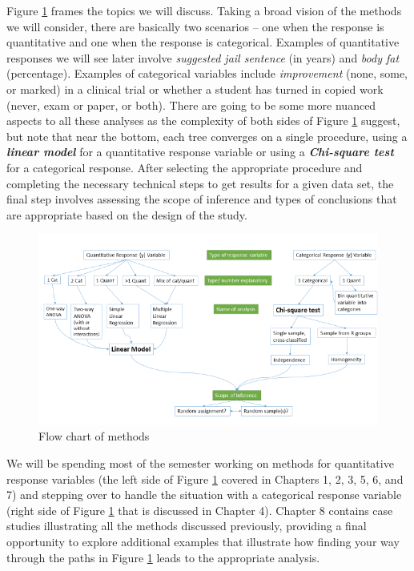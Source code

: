 \documentclass[]{book}
\begin{document}
Figure \ref{fig:Figure1} frames the topics we will discuss. Taking a
broad vision of the methods we will consider, there are basically two
scenarios -- one when the response is quantitative and one when the
response is categorical. Examples of quantitative responses we will see
later involve \emph{suggested jail sentence} (in years) and \emph{body
fat} (percentage). Examples of categorical variables include
\emph{improvement} (none, some, or marked) in a clinical trial or
whether a student has turned in copied work (never, exam or paper, or
both). There are going to be some more nuanced aspects to all these
analyses as the complexity of both sides of Figure \ref{fig:Figure1}
suggest, but note that near the bottom, each tree converges on a single
procedure, using a \textbf{\emph{linear model}} for a quantitative
response variable or using a \textbf{\emph{Chi-square test}} for a
categorical response. After selecting the appropriate procedure and
completing the necessary technical steps to get results for a given data
set, the final step involves assessing the scope of inference and types
of conclusions that are appropriate based on the design of the study.



\begin{figure}
\includegraphics[width=8.89in]{chapter0_files/image001} \caption{Flow chart of methods}\label{fig:Figure1}
\end{figure}

We will be spending most of the semester working on methods for
quantitative response variables (the left side of Figure
\ref{fig:Figure1} covered in Chapters 1, 2, 3, 5, 6, and 7) and stepping
over to handle the situation with a categorical response variable (right
side of Figure \ref{fig:Figure1} that is discussed in Chapter 4).
Chapter 8 contains case studies illustrating all the methods discussed
previously, providing a final opportunity to explore additional examples
that illustrate how finding your way through the paths in Figure
\ref{fig:Figure1} leads to the appropriate analysis.
\end{document}
